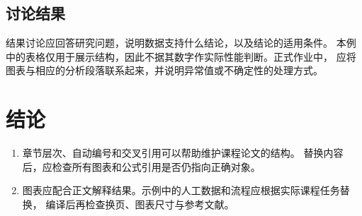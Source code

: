 \subsection{讨论结果}
结果讨论应回答研究问题，说明数据支持什么结论，以及结论的适用条件。
本例中的表格仅用于展示结构，因此不据其数字作实际性能判断。正式作业中，
应将图表与相应的分析段落联系起来，并说明异常值或不确定性的处理方式。

\section{结论}
\begin{enumerate}
  \item 章节层次、自动编号和交叉引用可以帮助维护课程论文的结构。
    替换内容后，应检查所有图表和公式引用是否仍指向正确对象。
  \item 图表应配合正文解释结果。示例中的人工数据和流程应根据实际课程任务替换，
    编译后再检查换页、图表尺寸与参考文献。
\end{enumerate}
